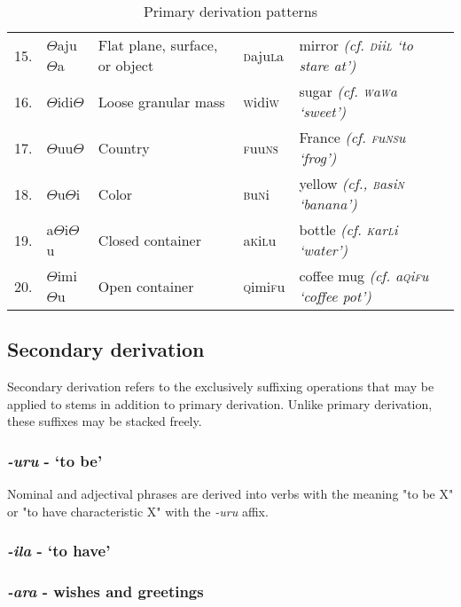 \documentclass[a4paper,10pt,twoside,openright]{memoir}
\newcommand{\rootpart}{$\Theta$}
\newcommand{\famword}[5]{#1\textsc{#2}#3\textsc{#4}#5}
\begin{document}
\begin{table}[ht]
\begin{tabular}{@{}rllll@{}}
    15. & {\rootpart}aju{\rootpart}a & Flat plane, surface, or object & \famword{}{d}{aju}{l}{a} & mirror \emph{(cf. \famword{}{d}{ii}{l}{} `to stare at')} \\
    16. & {\rootpart}idi{\rootpart} & Loose granular mass & \famword{}{w}{idi}{w}{} & sugar \emph{(cf. \textsc{w}a\textsc{w}a `sweet')} \\
    17. & {\rootpart}uu{\rootpart} & Country & \famword{}{f}{uu}{ns}{} & France \emph{(cf. \famword{}{f}{u}{ns}{u} `frog')} \\
    18. & {\rootpart}u{\rootpart}i & Color & \famword{}{b}{u}{n}{i} & yellow \emph{(cf., \famword{}{b}{asi}{n}{} `banana')} \\
    19. & a{\rootpart}i{\rootpart}u & Closed container & \famword{a}{k}{i}{l}{u} & bottle \emph{(cf. \famword{}{k}{ar}{l}{i} `water')} \\
    20. & {\rootpart}imi{\rootpart}u & Open container & \famword{}{q}{imi}{f}{u} & coffee mug \emph{(cf. \famword{a}{q}{i}{f}{u} `coffee pot')} \\
    \end{tabular}
    \caption{Primary derivation patterns}
    \label{tab:primedevs}
\end{table}

\subsection{Secondary derivation}

Secondary derivation refers to the exclusively suffixing operations that may be applied to stems in addition to primary derivation. Unlike primary derivation, these suffixes may be stacked freely. 

\subsubsection{\emph{-uru} - `to be'}

Nominal and adjectival phrases are derived into verbs with the meaning "to be X" or "to have characteristic X" with the \emph{-uru} affix. 

\subsubsection{\emph{-ila} - `to have'}

\subsubsection{\emph{-ara} - wishes and greetings}
\end{document}
